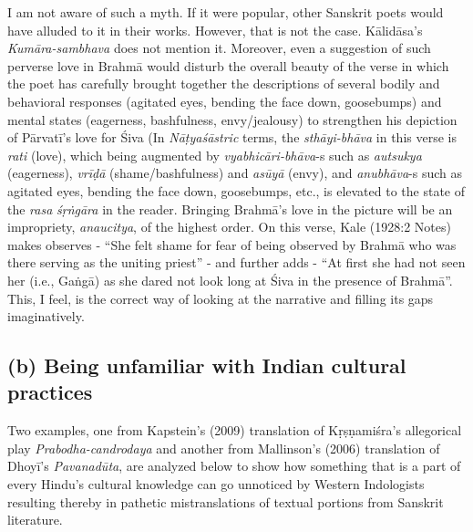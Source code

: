 I am not aware of such a myth. If it were popular, other Sanskrit poets would have alluded to it in their works. However, that is not the case. Kālidāsa’s \textsl{Kumāra-sambhava} does not mention it. Moreover, even a suggestion of such perverse love in Brahmā would disturb the overall beauty of the verse in which the poet has carefully brought together the descriptions of several bodily and behavioral responses (agitated eyes, bending the face down, goosebumps) and mental states (eagerness, bashfulness, envy/jealousy) to strengthen his depiction of Pārvatī’s love for Śiva (In \textsl{Nāṭyaśāstric} terms, the \textsl{sthāyi-bhāva} in this verse is \textsl{rati} (love), which being augmented by \textsl{vyabhicāri-bhāva}-s such as \textsl{autsukya} (eagerness), \textsl{vrīḍā} (shame/bashfulness) and \textsl{asūyā} (envy), and \textsl{anubhāva}-s such as agitated eyes, bending the face down, goosebumps, etc., is elevated to the state of the \textsl{rasa} \textsl{śṛṅgāra} in the reader. Bringing Brahmā’s love in the picture will be an impropriety, \textsl{anaucitya},
 of the highest order. On this verse, Kale (1928:2 Notes) makes observes - “She felt shame for fear of being observed by Brahmā who was there serving as the uniting priest” - and further adds - “At first she had not seen her (i.e., Gaṅgā) as she dared not look long at Śiva
 in the presence of Brahmā”. This, I feel, is the correct way of looking at the narrative and filling its gaps imaginatively.

\subsection*{(b) Being unfamiliar with Indian cultural practices}

Two examples, one from Kapstein’s (2009) translation of Kṛṣṇamiśra’s allegorical play \textsl{Prabodha-candrodaya} and another from Mallinson’s (2006) translation of Dhoyī’s \textsl{Pavanadūta}, are analyzed below to show how something that is a part of every Hindu’s cultural knowledge can go unnoticed by Western Indologists resulting thereby in pathetic mistranslations of textual portions from Sanskrit literature. 

